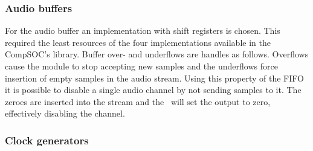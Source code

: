\subsubsection{Audio buffers}
For the audio buffer an implementation with shift registers is chosen. This required the least resources of the four implementations available in the CompSOC's library. Buffer over- and underflows are handles as follows. Overflows cause the module to stop accepting new samples and the underflows force insertion of empty samples in the audio stream. Using this property of the FIFO it is possible to disable a single audio channel by not sending samples to it. The zeroes are inserted into the stream and the \cs~will set the output to zero, effectively disabling the channel. 

\subsubsection{Clock generators}
